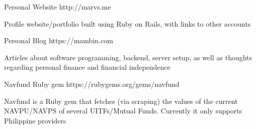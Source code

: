 

\begin{cventries}

  \cventry
    {Personal Website}
    {http://marvs.me}
    {}
    {}
    {
      \begin{cvitems} %
        \item {Profile website/portfolio built using Ruby on Rails, with links to other accounts}
      \end{cvitems}
    }

  \cventry
    {Personal Blog}
    {https://mambin.com}
    {}
    {}
    {
      \begin{cvitems} %
        \item {Articles about software programming, backend, server setup, as well as thoughts regarding personal finance and financial independence}
      \end{cvitems}
    }

  \cventry
    {Navfund Ruby gem}
    {https://rubygems.org/gems/navfund}
    {}
    {}
    {
      \begin{cvitems} %
        \item {Navfund is a Ruby gem that fetches (via scraping) the values of the current NAVPU/NAVPS of several UITFs/Mutual Funds. Currently it only supports Philippine providers}
      \end{cvitems}
    }


\end{cventries}
